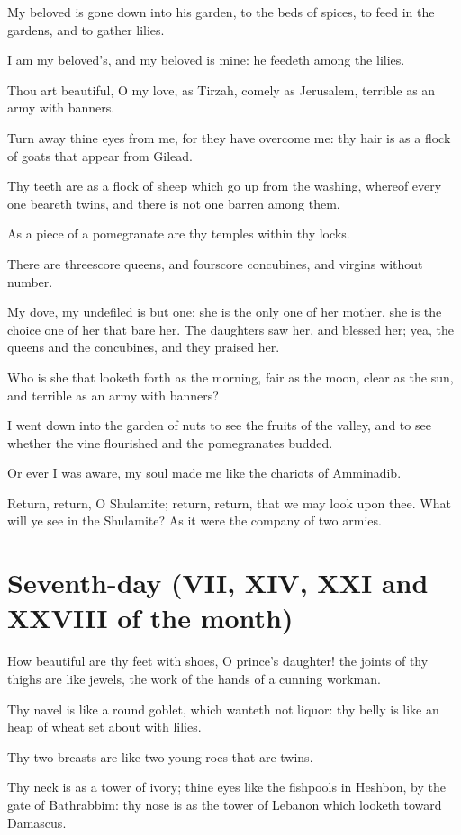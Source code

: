 \documentclass[0main.tex]{subfiles}
\begin{document}
My beloved is gone down into his garden, to the beds of spices, to feed in the gardens, and to gather lilies.

I am my beloved's, and my beloved is mine: he feedeth among the lilies.

Thou art beautiful, O my love, as Tirzah, comely as Jerusalem, terrible as an army with banners.

Turn away thine eyes from me, for they have overcome me: thy hair is as a flock of goats that appear from Gilead.

Thy teeth are as a flock of sheep which go up from the washing, whereof every one beareth twins, and there is not one barren among them.

As a piece of a pomegranate are thy temples within thy locks.

There are threescore queens, and fourscore concubines, and virgins without number.

My dove, my undefiled is but one; she is the only one of her mother, she is the choice one of her that bare her. The daughters saw her, and blessed her; yea, the queens and the concubines, and they praised her.

Who is she that looketh forth as the morning, fair as the moon, clear as the sun, and terrible as an army with banners?

I went down into the garden of nuts to see the fruits of the valley, and to see whether the vine flourished and the pomegranates budded.

Or ever I was aware, my soul made me like the chariots of Amminadib.

Return, return, O Shulamite; return, return, that we may look upon thee. What will ye see in the Shulamite? As it were the company of two armies.

\section*{Seventh-day (VII, XIV, XXI and XXVIII of the month)}

How beautiful are thy feet with shoes, O prince's daughter! the joints of thy thighs are like jewels, the work of the hands of a cunning workman.

Thy navel is like a round goblet, which wanteth not liquor: thy belly is like an heap of wheat set about with lilies.

Thy two breasts are like two young roes that are twins.

Thy neck is as a tower of ivory; thine eyes like the fishpools in Heshbon, by the gate of Bathrabbim: thy nose is as the tower of Lebanon which looketh toward Damascus.
\end{document}

